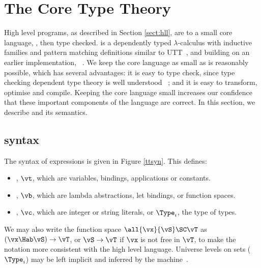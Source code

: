 \section{The Core Type Theory}

\label{sect:typechecking}

High level \Idris{} programs, as described in Section \ref{sect:hll}, are 
 to a small core language, \TT{}, then type checked. 
\TT{} is a dependently typed $\lambda$-calculus with inductive families
and pattern matching definitions similar to UTT~\cite{luo1994}, and building
on an earlier implementation, \Ivor{}~\cite{Brady2006b}.
We keep the
core language as small as is reasonably possible, which has several advantages: it is
easy to type check, since type checking dependent type theory is well understood
~\cite{loh2010tutorial}; and it is easy to transform, optimise and compile. Keeping
the core language small increases our confidence that these important components of
the language are correct. In this section, we describe \TT{} and
its semantics.

\subsection{\TT{} syntax}

The syntax of \TT{} expressions is given in Figure \ref{ttsyn}. This defines:

\begin{itemize}
\item {}, $\vt$, which are variables, bindings, applications or constants.
\item {}, $\vb$, which are lambda abstractions, let bindings, or function spaces.
\item {}, $\vc$, which are integer or string literals, or $\Type_i$, the
type of types.
\end{itemize}

We may also write the function space $\all{\vx}{\vS}\SC\vT$ as $(\vx\Hab\vS)\to\vT$,
or $\vS\to\vT$ if $\vx$ is not free in $\vT$, to make the notation more consistent with
the high level language. Universe levels on sets ($\Type_i$) may be left implicit and
inferred by the machine~\cite{pollack1990implicit}.

